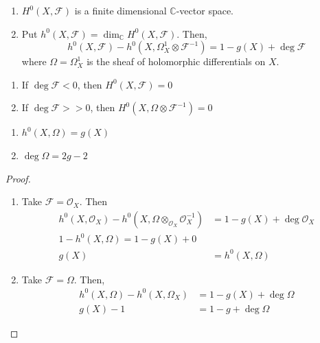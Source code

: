 \documentclass[oneside, 12pt]{scrbook}
\newcommand{\CC}{\mathbb C}
\theoremstyle{theorem}
\begin{document}
\begin{theorem}
\begin{enumerate}
\item $H^{0}(X, \mathcal{F})$ is a finite dimensional $\CC$-vector space.
\item Put $h^{0}(X,\mathcal{F}) = \dim_{\CC}H^{0} (X, \mathcal{F})$. Then, $$h^{0}(X, \mathcal{F}) - h^{0}(X, \Omega_{X}^{1} \otimes \mathcal{F}^{-1}) = 1- g(X) + \deg \mathcal{F}$$ where $\Omega = \Omega_{X}^{1}$ is the sheaf of holomorphic differentials on $X$.
\end{enumerate}
\end{theorem}

\begin{remark}[Facts]
\begin{enumerate}
\item If $\deg \mathcal{F} < 0$, then $H^{0}(X, \mathcal{F})=0$ 
\item If $\deg \mathcal{F} >>0$, then $H^{0}(X, \Omega \otimes \mathcal{F}^{-1})=0$
\end{enumerate}
\end{remark}

\begin{lemma}
\begin{enumerate}
\item $h^{0}(X, \Omega) = g(X)$
\item $\deg \Omega = 2g-2$
\end{enumerate}
\end{lemma}

\begin{proof}
\begin{enumerate}
\item Take $\mathcal{F}  = \mathcal{O}_{X}$. Then 
\begin{align*}
h^{0}(X, \mathcal{O}_{X}) - h^{0}(X, \Omega \otimes_{\mathcal{O}_{X}} \mathcal{O}_{X}^{-1}) &= 1 - g(X) + \deg \mathcal{O}_{X} \\
1 - h^{0}(X, \Omega) = 1- g(X) + 0\\
g(X) &= h^{0}(X,\Omega)
\end{align*}
\item Take $\mathcal{F} = \Omega$. Then, 
\begin{align*}
h^{0}(X, \Omega) - h^{0}(X, \Omega_{X}) &= 1 - g(X) + \deg \Omega \\
g(X) - 1 &= 1-g + \deg \Omega
\end{align*}
\end{enumerate}
\end{proof}
\end{document}
